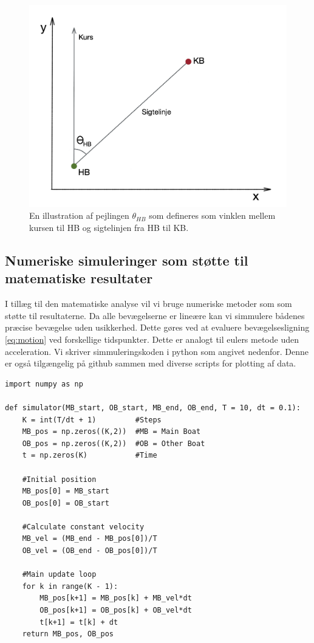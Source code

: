 \documentclass[%
 reprint,
nofootinbib,
aps,
]{revtex4-1}
\begin{document}
\begin{figure}[H]
  \includegraphics[width=\linewidth]{figures/metode_tegning.png}
  \caption{En illustration af pejlingen $\theta_{HB}$ som defineres som vinklen mellem kursen til HB og sigtelinjen fra HB til KB.  }
  \label{fig:metode_tegning}
\end{figure}

\subsection{Numeriske simuleringer som støtte til matematiske resultater}\label{sec:numerical_method}
I tillæg til den matematiske analyse vil vi bruge numeriske metoder som som støtte til resultaterne. Da alle bevægelserne er lineære kan vi simmulere bådenes præcise bevægelse uden usikkerhed. Dette gøres ved at evaluere bevægelsesligning \ref{eq:motion} ved forskellige tidspunkter. Dette er analogt til eulers metode uden acceleration. Vi skriver simmuleringskoden i python som angivet nedenfor. Denne er også tilgængelig på github \cite{github} sammen med diverse scripts for plotting af data.

\begin{verbatim}
import numpy as np

def simulator(MB_start, OB_start, MB_end, OB_end, T = 10, dt = 0.1):
    K = int(T/dt + 1)         #Steps
    MB_pos = np.zeros((K,2))  #MB = Main Boat
    OB_pos = np.zeros((K,2))  #OB = Other Boat
    t = np.zeros(K)           #Time

    #Initial position
    MB_pos[0] = MB_start
    OB_pos[0] = OB_start

    #Calculate constant velocity
    MB_vel = (MB_end - MB_pos[0])/T
    OB_vel = (OB_end - OB_pos[0])/T

    #Main update loop
    for k in range(K - 1):
        MB_pos[k+1] = MB_pos[k] + MB_vel*dt
        OB_pos[k+1] = OB_pos[k] + OB_vel*dt
        t[k+1] = t[k] + dt
    return MB_pos, OB_pos
\end{verbatim}
\end{document}
